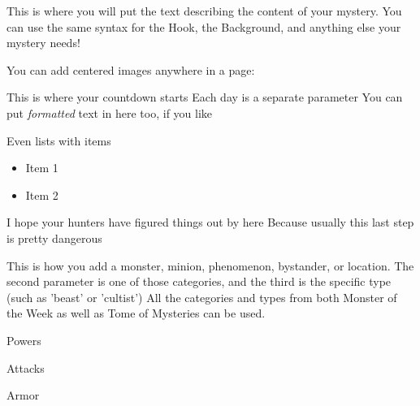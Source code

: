 \documentclass{motw}
\begin{document}



This is where you will put the text describing the content of your mystery.  You can use the same syntax for the Hook, the Background, and anything else your mystery needs!

You can add centered images anywhere in a page:

\Countdown%
{This is where your countdown starts}
{Each day is a separate parameter}
{You can put \emph{formatted} text in here too, if you like}
{Even lists with items
\begin{itemize}
    \item Item 1
    \item Item 2
\end{itemize}
}
{I hope your hunters have figured things out by here}
{Because usually this last step is pretty dangerous}




This is how you add a monster, minion, phenomenon, bystander, or location.  The second parameter is one of those categories, and the third is the specific type (such as 'beast' or 'cultist')  All the categories and types from both Monster of the Week as well as Tome of Mysteries can be used.

\begin{mStatList}{Powers}
\end{mStatList}

\begin{mStatBlock}{Attacks}
\end{mStatBlock}

\begin{mStatBlock}{Armor}
\end{mStatBlock}
\end{document}
